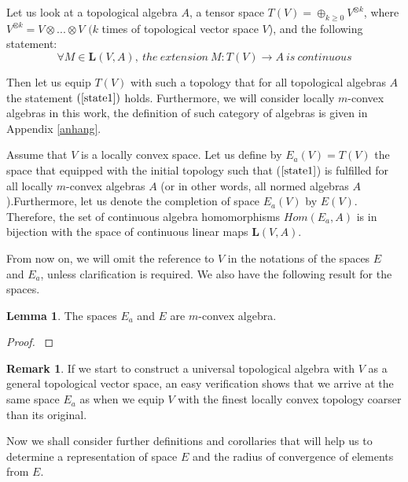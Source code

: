 \documentclass[12pt,a4paper]{report}
\theoremstyle{definition}
\newtheorem{lemma}{Lemma}
\newtheorem{remark}{Remark}
\begin{document}
Let us look at a topological algebra $A$, a tensor space $T(V)=\oplus_{k\geq0}V^{\otimes k}$, where $V^{\otimes k}=V\otimes...\otimes V$ $(k$ times of topological vector space $V$), and the following statement: 
\begin{equation} \label{state1}
	\forall M\in \textbf{L}(V,A),\: the\: extension\: M:T(V)\rightarrow A\: is\: continuous
\end{equation}


Then let us equip $T(V)$ with such a topology that for all topological algebras $A$ the statement $(\ref{state1})$ holds. Furthermore, we will consider locally $m$-convex algebras in this work, the definition of such category of algebras is given in Appendix \ref{anhang}.

 	Assume that $V$ is a locally convex space. Let us define by $E_a(V) = T (V )$ the space that equipped with the initial topology such that ($\ref{state1}$) is fulfilled for all locally $m$-convex algebras $A$ (or in other words, all normed algebras $A$).Furthermore, let us denote the completion of space $E_a(V)$ by $E(V)$. Therefore, the set of continuous algebra homomorphisms $ Hom(E_a, A)$ is in bijection with the space of continuous linear maps $\textbf{L}(V, A)$.


From now on, we will omit the reference to $V$ in the notations of the spaces $E$ and $E_a$, unless clarification is required. We also have the following result for the spaces.


\begin{lemma}
	The spaces $E_a$ and $E$ are $m$-convex algebra.
\end{lemma}

\begin{proof}
	\parencite[see][p.14 and p.22]{mallios1986topological}
\end{proof}


\begin{remark} \parencite[see][]{chevyrev2016characteristic}
	If we start to construct a universal topological algebra with $V$ as a general topological vector space, an easy 	verification shows that we arrive at the same space $E_a$ as when we equip $V$ with the finest locally convex topology coarser than its original.
\end{remark} 

Now we shall consider further definitions and corollaries that will help us to determine a representation of space $E$ and the radius of convergence of elements from $E$.
\end{document}
